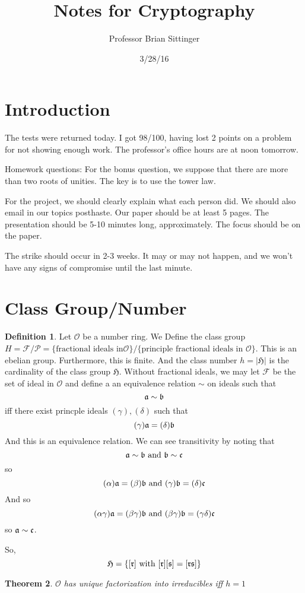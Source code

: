 \documentclass{article}
\title{Notes for Cryptography}
\author{Professor Brian Sittinger}
\date{3/28/16}
\theoremstyle{plain}
\newtheorem{thm}{Theorem}%
\theoremstyle{definition}
\newtheorem{defn}[thm]{Definition} %
\begin{document}
\maketitle
\section{Introduction}
The tests were returned today. I got 98/100, having lost 2 points on a problem
for not showing enough work. The professor's office hours are at noon tomorrow.

Homework questions: For the bonus question, we suppose that there are more than
two roots of unities. The key is to use the tower law. 

For the project, we should clearly explain what each person did. We should also
email in our topics posthaste. Our paper should be at least 5 pages. The
presentation should be 5-10 minutes long, approximately. The focus should be on
the paper. 

The strike should occur in 2-3 weeks. It may or may not happen, and we won't
have any signs of compromise until the last minute.

\section{Class Group/Number}
\begin{defn}
Let $\mathcal{O}$ be a number ring. We Define the class group $H = \mathcal{F} /
\mathcal{P} = \{ \text{fractional ideals in} \mathcal{O} \} / \{ \text{principle
fractional ideals in } \mathcal{O}\} $. This is an ebelian group. Furthermore,
this is finite. And the class number $h = |\mathfrak{H}|$ is the cardinality of the class group
$\mathfrak{H}$. Without fractional ideals, we may let $\mathcal{F}$ be the set of
ideal in $\mathcal{O}$ and define a an equivalence relation $\sim$ on ideals
such that 
\[ \frak{a} \sim \frak{b} \]
iff there exist princple ideals $(\gamma), (\delta)$ such that 
\[ (\gamma)\frak{a} = (\delta)\frak{b} \]
And this is an equivalence relation. We can see transitivity by noting that
\[ \frak{a} \sim \frak{b} \text{ and } \frak{b} \sim \frak{c} \]
so
\[ (\alpha)\frak{a} = (\beta) \frak{b} \text{ and } (\gamma) \frak{b} = (\delta)
\frak{c} \]
And so
\[ (\alpha\gamma )\frak{a} = (\beta \gamma) \frak{b} \text{ and } (\beta\gamma)
\frak{b} = (\gamma \delta) \frak{c} \]
so $\frak{a} \sim \frak{c}$.
\end{defn}
So, 
\[ \mathfrak{H} = \{ [\mathfrak{r}] \text{ with } [\frak{r}][\frak{s}] =
[\mathfrak{rs}] \} \]
\begin{thm}
$\mathcal{O}$ has unique factorization into irreducibles iff $h = 1$
\end{thm}
\end{document}
